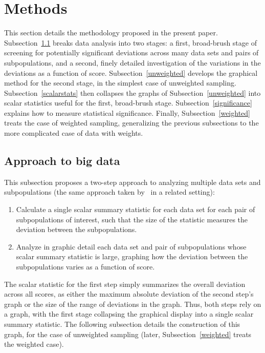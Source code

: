 \documentclass{article}
\begin{document}
\section{Methods}
\label{methods}

This section details the methodology proposed in the present paper.
Subsection~\ref{high-level} breaks data analysis into two stages:
a first, broad-brush stage of screening for potentially significant deviations
across many data sets and pairs of subpopulations,
and a second, finely detailed investigation of the variations
in the deviations as a function of score.
Subsection~\ref{unweighted} develops the graphical method
for the second stage, in the simplest case of unweighted sampling.
Subsection~\ref{scalarstats} then collapses the graphs
of Subsection~\ref{unweighted} into scalar statistics
useful for the first, broad-brush stage.
Subsection~\ref{significance} explains how to measure statistical significance.
Finally, Subsection~\ref{weighted} treats the case of weighted sampling,
generalizing the previous subsections to the more complicated case
of data with weights.


\subsection{Approach to big data}
\label{high-level}

This subsection proposes a two-step approach to analyzing
multiple data sets and subpopulations (the same approach taken by~\cite{tygert}
in a related setting):
%
\begin{enumerate}
\item Calculate a single scalar summary statistic
for each data set for each pair of subpopulations of interest,
such that the size of the statistic
measures the deviation between the subpopulations.
\item Analyze in graphic detail each data set and pair of subpopulations
whose scalar summary statistic is large, graphing how the deviation
between the subpopulations varies as a function of score.
\end{enumerate}

The scalar statistic for the first step simply summarizes
the overall deviation across all scores,
as either the maximum absolute deviation of the second step's graph
or the size of the range of deviations in the graph.
Thus, both steps rely on a graph, with the first stage collapsing
the graphical display into a single scalar summary statistic.
The following subsection details the construction of this graph,
for the case of unweighted sampling (later, Subsection~\ref{weighted} treats
the weighted case).
\end{document}
